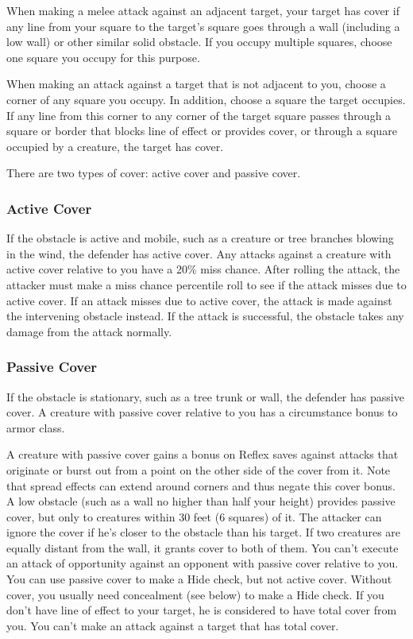  When making a melee attack against an adjacent target, your target has cover if any line from your square to the target's square goes through a wall (including a low wall) or other similar solid obstacle. If you occupy multiple squares, choose one square you occupy for this purpose.

When making an attack against a target that is not adjacent to you, choose a corner of any square you occupy. In addition, choose a square the target occupies. If any line from this corner to any corner of the target square passes through a square or border that blocks line of effect or provides cover, or through a square occupied by a creature, the target has cover.

There are two types of cover: active cover and passive cover.

\subsubsection{Active Cover}

If the obstacle is active and mobile, such as a creature or tree branches blowing in the wind, the defender has active cover. Any attacks against a creature with active cover relative to you have a 20\% miss chance. After rolling the attack, the attacker must make a miss chance percentile roll to see if the attack misses due to active cover. If an attack misses due to active cover, the attack is made against the intervening obstacle instead. If the attack is successful, the obstacle takes any damage from the attack normally. 

\subsubsection{Passive Cover}

If the obstacle is stationary, such as a tree trunk or wall, the defender has passive cover. A creature with passive cover relative to you has a  circumstance bonus to armor class.

 A creature with passive cover gains a  bonus on Reflex saves against attacks that originate or burst out from a point on the other side of the cover from it. Note that spread effects can extend around corners and thus negate this cover bonus.
 A low obstacle (such as a wall no higher than half your height) provides passive cover, but only to creatures within 30 feet (6 squares) of it. The attacker can ignore the cover if he's closer to the obstacle than his target. If two creatures are equally distant from the wall, it grants cover to both of them.
 You can't execute an attack of opportunity against an opponent with passive cover relative to you.
 You can use passive cover to make a Hide check, but not active cover. Without cover, you usually need concealment (see below) to make a Hide check.
 If you don't have line of effect to your target, he is considered to have total cover from you. You can't make an attack against a target that has total cover.

